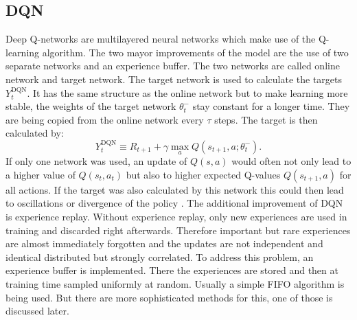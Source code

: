 \subsection{DQN\anna}
Deep Q-networks \cite{DBLP:journals/corr/MnihKSGAWR13} are multilayered neural networks which make use of the Q-learning algorithm. The two mayor improvements of the model are the use of two separate networks and an experience buffer.
The two networks are called online network and target network. The target network is used to calculate the targets $Y_{t}^{\mathrm{DQN}}$. It has the same structure as the online network but to make learning more stable, the weights of the target network $\theta_t^-$ stay constant for a longer time. 
They are being copied from the online network every $\tau$ steps.
The target is then calculated by:
\begin{equation}
Y_{t}^{\mathrm{DQN}} \equiv R_{t+1}+\gamma \max _{a} Q\left(s_{t+1}, a ; \theta_{t}^{-}\right).
\end{equation}
If only one network was used, an update of $Q(s,a)$ would often not only lead to a higher value of $Q(s_t,a_t)$ but also to higher expected Q-values $Q(s_{t+1},a)$ for all actions. If the target was also calculated by this network this could then lead to oscillations or divergence of the policy \cite{DBLP:journals/corr/MnihKSGAWR13}.
The additional improvement of DQN is experience replay. Without experience replay, only new experiences are used in training and discarded right afterwards.
Therefore important but rare experiences are almost immediately forgotten and the updates are not independent and identical distributed but strongly correlated. %
To address this problem, an experience buffer is implemented. There the experiences are stored and then at training time sampled uniformly at random. Usually a simple FIFO algorithm is being used. But there are more sophisticated methods for this, one of those is discussed later.